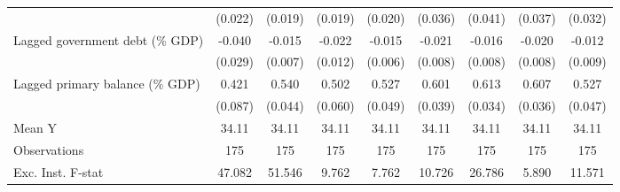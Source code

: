 {\begin{tabular}{l*{8}{c}}
                    &     (0.022)         &     (0.019)         &     (0.019)         &     (0.020)         &     (0.036)         &     (0.041)         &     (0.037)         &     (0.032)         \\
\addlinespace
Lagged government debt (\% GDP)&      -0.040         &      -0.015\sym{**} &      -0.022\sym{*}  &      -0.015\sym{**} &      -0.021\sym{***}&      -0.016\sym{**} &      -0.020\sym{**} &      -0.012         \\
                    &     (0.029)         &     (0.007)         &     (0.012)         &     (0.006)         &     (0.008)         &     (0.008)         &     (0.008)         &     (0.009)         \\
\addlinespace
Lagged primary balance (\% GDP)&       0.421\sym{***}&       0.540\sym{***}&       0.502\sym{***}&       0.527\sym{***}&       0.601\sym{***}&       0.613\sym{***}&       0.607\sym{***}&       0.527\sym{***}\\
                    &     (0.087)         &     (0.044)         &     (0.060)         &     (0.049)         &     (0.039)         &     (0.034)         &     (0.036)         &     (0.047)         \\
\midrule
Mean Y              &       34.11         &       34.11         &       34.11         &       34.11         &       34.11         &       34.11         &       34.11         &       34.11         \\
Observations        &         175         &         175         &         175         &         175         &         175         &         175         &         175         &         175         \\
Exc. Inst. F-stat   &      47.082         &      51.546         &       9.762         &       7.762         &      10.726         &      26.786         &       5.890         &      11.571         \\
\bottomrule
\end{tabular}
}
